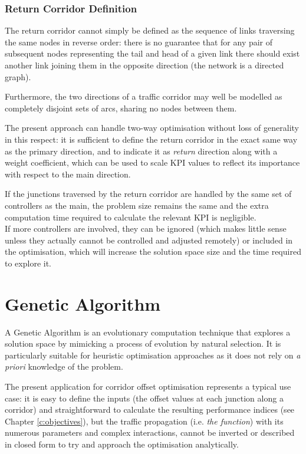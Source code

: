 \subsubsection*{Return Corridor Definition}
The return corridor cannot simply be defined as the sequence of links traversing the same nodes in reverse order: there is no guarantee that for any pair of subsequent nodes representing the tail and head of a given link there should exist another link joining them in the opposite direction (the network is a directed graph).

Furthermore, the two directions of a traffic corridor may well be modelled as completely disjoint sets of arcs, sharing no nodes between them.

The present approach can handle two-way optimisation without loss of generality in this respect: it is sufficient to define the return corridor in the exact same way as the primary direction, and to indicate it as \emph{return} direction along with a weight coefficient, which can be used to scale KPI values to reflect its importance with respect to the main direction.

If the junctions traversed by the return corridor are handled by the same set of controllers as the main, the problem size remains the same and the extra computation time required to calculate the relevant KPI is negligible. \\
If more controllers are involved, they can be ignored (which makes little sense unless they actually cannot be controlled and adjusted remotely) or included in the optimisation, which will increase the solution space size and the time required to explore it.


\section{Genetic Algorithm} \label{s:geneticalgo}
\newcommand{\solution}{\mathbf{s}}
A Genetic Algorithm is an evolutionary computation technique that explores a solution space by mimicking a process of evolution by natural selection. It is particularly suitable for heuristic optimisation approaches as it does not rely on \emph{a priori} knowledge of the problem.

The present application for corridor offset optimisation represents a typical use case: it is easy to define the inputs (the offset values at each junction along a corridor) and straightforward to calculate the resulting performance indices (see Chapter \ref{c:objectives}), but the traffic propagation (i.e. \emph{the function}) with its numerous parameters and complex interactions, cannot be inverted or described in closed form to try and approach the optimisation analytically. 

